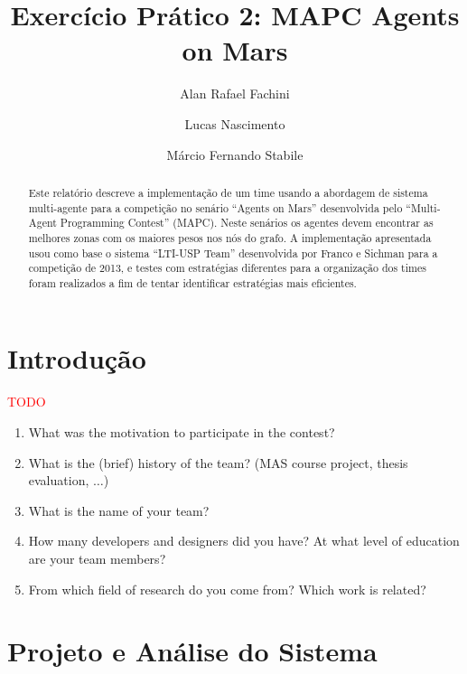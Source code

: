 \documentclass{llncs}
\begin{document}
\title{Exercício Prático 2: MAPC Agents on Mars}

\author{Alan Rafael Fachini \and Lucas Nascimento \and Márcio Fernando Stabile}

\maketitle

\begin{abstract}
Este relatório descreve a implementação de um time usando a abordagem de sistema multi-agente para a competição no senário ``Agents on Mars'' desenvolvida pelo ``Multi-Agent Programming Contest'' (MAPC). Neste senários os agentes devem encontrar as melhores zonas com os maiores pesos nos nós do grafo. A implementação apresentada usou como base o sistema ``LTI-USP Team'' desenvolvida por Franco e Sichman \cite{franco2013improving} para a competição de 2013, e testes com estratégias diferentes para a organização dos times foram realizados a fim de tentar identificar estratégias mais eficientes.
\end{abstract}

\section{Introdução}

\textcolor{red}{TODO}
\begin{enumerate}
\item What was the motivation to participate in the contest?
\item What is the (brief) history of the team? (MAS course project,
  thesis evaluation, $\ldots$)
\item What is the name of your team?
\item How many developers and designers did you have? At what level of education are your team members?
\item From which field of research do you come from? Which work is related?
\end{enumerate}

\section{Projeto e Análise do Sistema}
\end{document}

